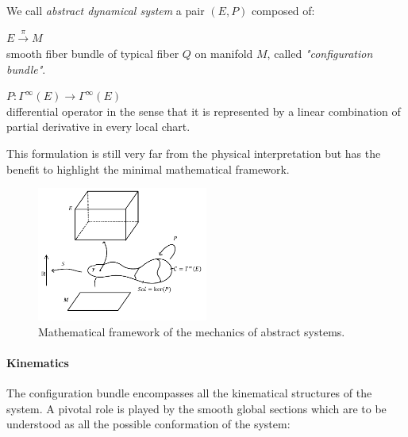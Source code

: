 \documentclass[Main]{subfiles}
\begin{document}
	\begin{definition}\label{Def:AbstracDynamicalSystem}
		We call \emph{abstract dynamical system} 
		a pair $(E,P )$ composed of:
		\begin{compactitemize}
			\item $E \xrightarrow{\pi} M$ \\
			smooth fiber bundle of typical fiber $Q$ on  manifold $M$, called \emph{"configuration bundle"}.
			\item	$ P : \Gamma^\infty(E) \rightarrow \Gamma^\infty(E)$ \\
			differential operator %
			in the sense that it is represented by a linear combination of partial derivative in every local chart.
		\end{compactitemize}
	\end{definition}
	This formulation is still very far from the physical interpretation but has the benefit to highlight the minimal mathematical framework.
	\begin{figure}[h!]
		\centering
		\includegraphics[width=0.5\textwidth]{Pictures/AbstractFieldTheory} 
		 	 	\caption{Mathematical framework of the mechanics of abstract systems. }
	\end{figure}		
	
	\paragraph{Kinematics}
	The configuration bundle encompasses all the kinematical structures of the system.
	 A pivotal role is played by the smooth global sections  which are to be understood as all the possible conformation of the system:
\end{document}
